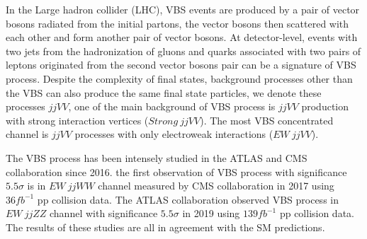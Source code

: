 \documentclass[12pt]{article}
\begin{document}
        \par In the Large hadron collider (LHC)\cite{Evans:2008zzb}, VBS events are produced by a pair of vector bosons 
        radiated from the initial partons, the vector bosons then scattered with each other and form another pair of vector bosons. 
        At detector-level, events with two jets from the hadronization of gluons and quarks associated with two pairs of leptons originated from the second vector bosons pair 
        can be a signature of VBS process. Despite the complexity of final states, background processes other than the VBS can 
        also produce the same final state particles, we denote these processes $jjVV$, one of the main background of VBS process is $jjVV$ 
        production with strong interaction vertices ($Strong\ jjVV$). The most VBS concentrated channel is $jjVV$ processes with only electroweak interactions ($EW\ jjVV$). 

        \par The VBS process has been intensely studied in the ATLAS and CMS collaboration since 2016\cite{ALESSANDRO201844}. 
        the first observation of VBS process with significance $5.5\sigma$ is in $EW\ jjWW$ channel measured by CMS collaboration in 2017
        using $36fb^{-1}$ pp collision data\cite{PhysRevLett.120.081801}. The ATLAS collaboration observed VBS process in $EW\ jjZZ$ channel with significance $5.5\sigma$ 
        in 2019 using $139fb^{-1}$ pp collision data\cite{ATLAS-CONF-2019-033}. The results of these studies are all in agreement with the SM predictions.
        
\end{document}
